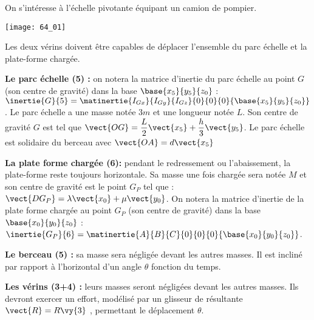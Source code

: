 \normaltrue \difficilefalse \tdifficilefalse
\correctionfalse


\setcounter{question}{0}
\ifcorrection
\else
{}
\fi

\ifprof
\else


On s'intéresse à l'échelle pivotante équipant un camion de pompier.

\begin{marginfigure}
\centering
\texttt{[image: 64\_01]}
\end{marginfigure}

Les deux vérins doivent être capables de déplacer l’ensemble du parc échelle et la plate-forme
chargée.

\textbf{Le parc échelle (5) :} 
on notera la matrice d’inertie du parc échelle au point $G$ (son centre de gravité) dans la base 
$\base{x_5}{y_5}{z_0}$ : $\inertie{G}{5} = \matinertie{I_{Gx}}{I_{Gy}}{I_{Gz}}{0}{0}{0}{\base{x_5}{y_5}{z_0}}$. Le parc échelle a une masse notée $3m$ et une longueur notée $L$. Son centre de gravité $G$ est tel que $\vect{OG}=\dfrac{L}{2}\vect{x_5}+\dfrac{h}{3}\vect{y_5}$. 
Le parc échelle est solidaire du berceau avec $\vect{OA}=d\vect{x_5}$

\textbf{La plate forme chargée (6):} pendant le redressement ou l’abaissement, la plate-forme reste toujours horizontale.
Sa masse une fois chargée sera notée $M$ et son centre de gravité est le point $G_P$ tel que : 
$\vect{DG_P}=\lambda \vect{x_0} + \mu\vect{y_0}$.
On notera la matrice d’inertie de la plate forme chargée au point $G_P$ (son centre de gravité) dans la base 
$\base{x_0}{y_0}{z_0}$ : $\inertie{G_P}{6} = \matinertie{A}{B}{C}{0}{0}{0}{\base{x_0}{y_0}{z_0}}$.

\textbf{Le berceau (5) :} sa masse sera négligée devant les autres masses. Il est incliné par rapport à l’horizontal d’un angle $\theta$ fonction du temps.

\textbf{Les vérins (3+4) :} leurs masses seront négligées devant les autres masses.
Ils devront exercer un effort, modélisé par un glisseur de résultante $\vect{R}=R\vy{3}$ , permettant le
déplacement $\theta$.
\fi

\ifprof
\else
\fi

